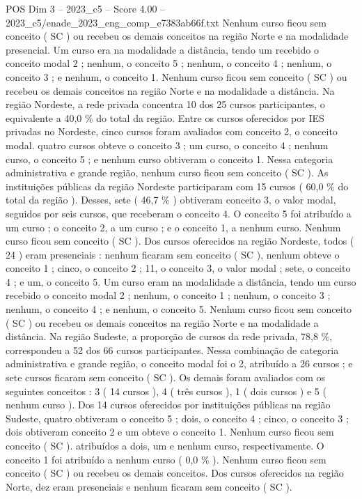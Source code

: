 \begin{textsample}{POS Dim 3 – 2023\_c5 – Score 4.00 – 2023\_c5/enade\_2023\_eng\_comp\_e7383ab66f.txt}
Nenhum curso ficou sem conceito ( SC ) ou recebeu os demais conceitos na região Norte e na modalidade presencial.
Um curso era na modalidade a distância, tendo um recebido o conceito modal 2 ; nenhum, o conceito 5 ; nenhum, o conceito 4 ; nenhum, o conceito 3 ; e nenhum, o conceito 1.
Nenhum curso ficou sem conceito ( SC ) ou recebeu os demais conceitos na região Norte e na modalidade a distância.
Na região Nordeste, a rede privada concentra 10 dos 25 cursos participantes, o equivalente a 40,0 \% do total da região.
Entre os cursos oferecidos por IES privadas no Nordeste, cinco cursos foram avaliados com conceito 2, o conceito modal. quatro cursos obteve o conceito 3 ; um curso, o conceito 4 ; nenhum curso, o conceito 5 ; e nenhum curso obtiveram o conceito 1.
Nessa categoria administrativa e grande região, nenhum curso ficou sem conceito ( SC ).
As instituições públicas da região Nordeste participaram com 15 cursos ( 60,0 \% do total da região ).
Desses, sete ( 46,7 \% ) obtiveram conceito 3, o valor modal, seguidos por seis cursos, que receberam o conceito 4.
O conceito 5 foi atribuído a um curso ; o conceito 2, a um curso ; e o conceito 1, a nenhum curso.
Nenhum curso ficou sem conceito ( SC ).
Dos cursos oferecidos na região Nordeste, todos ( 24 ) eram presenciais : nenhum ficaram sem conceito ( SC ), nenhum obteve o conceito 1 ; cinco, o conceito 2 ; 11, o conceito 3, o valor modal ; sete, o conceito 4 ; e um, o conceito 5.
Um curso eram na modalidade a distância, tendo um curso recebido o conceito modal 2 ; nenhum, o conceito 1 ; nenhum, o conceito 3 ; nenhum, o conceito 4 ; e nenhum, o conceito 5.
Nenhum curso ficou sem conceito ( SC ) ou recebeu os demais conceitos na região Norte e na modalidade a distância.
Na região Sudeste, a proporção de cursos da rede privada, 78,8 \%, correspondeu a 52 dos 66 cursos participantes.
Nessa combinação de categoria administrativa e grande região, o conceito modal foi o 2, atribuído a 26 cursos ; e sete cursos ficaram sem conceito ( SC ).
Os demais foram avaliados com os seguintes conceitos : 3 ( 14 cursos ), 4 ( três cursos ), 1 ( dois cursos ) e 5 ( nenhum curso ).
Dos 14 cursos oferecidos por instituições públicas na região Sudeste, quatro obtiveram o conceito 5 ; dois, o conceito 4 ; cinco, o conceito 3 ; dois obtiveram conceito 2 e um obteve o conceito 1.
Nenhum curso ficou sem conceito ( SC ). atribuídos a dois, um e nenhum curso, respectivamente.
O conceito 1 foi atribuído a nenhum curso ( 0,0 \% ).
Nenhum curso ficou sem conceito ( SC ) ou recebeu os demais conceitos.
Dos cursos oferecidos na região Norte, dez eram presenciais e nenhum ficaram sem conceito ( SC ).

\end{textsample}
